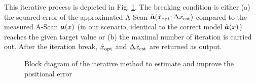 This iterative process is depicted in Fig. \ref{fig:blockdiagram_GD}. The breaking condition is either (a) the squared error of the approximated A-Scan $\bm{\tilde{a}} (\hat{x}_{\operatorname{opt}}; \Delta x_{\operatorname{est}})$ compared to the measured A-Scan $\bm{a} (x)$ (in our scenario, identical to the correct model $\bm{\hat{a}} (x)$) reaches the given target value or (b) the maximal number of iteration is carried out. After the iteration break, $\hat{x}_{\operatorname{opt}}$ and $\Delta x_{\operatorname{est}}$ are returned as output. 


\begin{figure}
\begin{center}
\caption{Block diagram of the iterative method to estimate and improve the positional error}
\label{fig:blockdiagram_GD} 
\end{center}
\end{figure}







